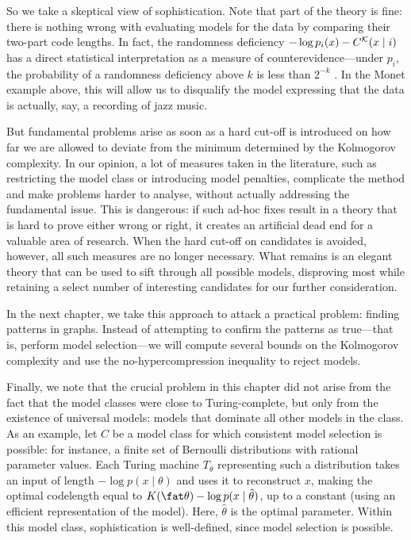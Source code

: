 So we take a skeptical view of sophistication. Note that part of the theory is fine: there is nothing wrong with evaluating models for the data by comparing their two-part code lengths. In fact, the randomness deficiency $-\log p_i(x)-C^{\cal K}(x\mid i)$ has a direct statistical interpretation as a measure of counterevidence---under $p_i$, the probability of a randomness deficiency above $k$ is less than $2^{-k}$ \cite[Lemma~6]{bloem2014safe}. In the Monet example above, this will allow us to disqualify the model expressing that the data is actually, say, a recording of jazz music.

But fundamental problems arise as soon as a hard cut-off is introduced on how far we are allowed to deviate from the minimum determined by the Kolmogorov complexity. In our opinion, a lot of measures taken in the literature, such as restricting the model class or introducing model penalties, complicate the method and make problems harder to analyse, without actually addressing the fundamental issue. This is dangerous: if such ad-hoc fixes result in a theory that is hard to prove either wrong or right, it creates an artificial dead end for a valuable area of research. When the hard cut-off on candidates is avoided, however, all such measures are no longer necessary. What remains is an elegant theory that can be used to sift through all possible models, disproving most while retaining a select number of interesting candidates for our further consideration.

In the next chapter, we take this approach to attack a practical problem: finding patterns in graphs. Instead of attempting to confirm the patterns as true---that is, perform model selection---we will compute several bounds on the Kolmogorov complexity and use the no-hypercompression inequality to reject models.

Finally, we note that the crucial problem in this chapter did not arise from the fact that the model classes were close to Turing-complete, but only from the existence of universal models: models that dominate all other models in the class. As an example, let $C$ be a model class for which consistent model selection is possible: for instance, a finite set of Bernoulli distributions with rational parameter values. Each Turing machine $T_\theta$ representing such a distribution takes an input of length $- \log p(x\mid \theta)$ and uses it to reconstruct $x$, making the optimal codelength equal to $K(\fat\theta) - \log p(x\mid \hat\theta)$, up to a constant (using an efficient representation of the model). Here, $\hat\theta$ is the optimal parameter. Within this model class, sophistication is well-defined, since model selection is possible.

